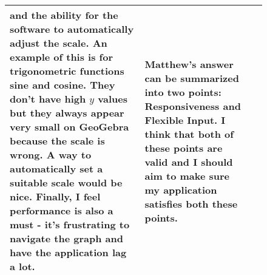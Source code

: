 \documentclass[../../../main.tex]{subfiles}
\begin{document}
\begin{savenotes}
\begin{figure}[H]
\begin{tabular}{|L{0.15\textwidth}|m{0.5\textwidth}|L{0.25\textwidth}|}
		and the ability for the software to automatically adjust the scale. An example of this is for trigonometric functions sine and cosine. They don't have high $y$ values but they always appear very small on GeoGebra because the scale is wrong. A way to automatically set a suitable scale would be nice. Finally, I feel performance is also a must - it's frustrating to navigate the graph and have the application lag a lot.
		&
		Matthew's answer can be summarized into two points: Responsiveness and Flexible Input. I think that both of these points are valid and I should aim to make sure my application satisfies both these points. \\
		\hline
		\end{tabular}
	
	\end{figure}
\end{savenotes}
\end{document}
